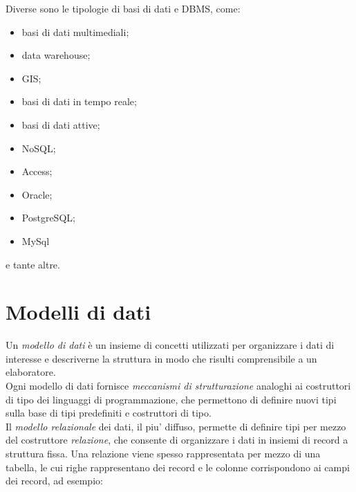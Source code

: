 \documentclass[12pt]{report}
\begin{document}
			Diverse sono le tipologie di basi di dati e DBMS, come:
			\begin{itemize}
				\item basi di dati multimediali;
				\item data warehouse;
				\item GIS;
				\item basi di dati in tempo reale;
				\item basi di dati attive;
				\item NoSQL;
				\item Access;
				\item Oracle;
				\item PostgreSQL;
				\item MySql
			\end{itemize}
			e tante altre. \\
			\section{Modelli di dati}
			Un \textit{modello di dati} è un insieme di concetti utilizzati per organizzare i dati di interesse e descriverne la struttura in modo che risulti comprensibile a un elaboratore. \\
			Ogni modello di dati fornisce \textit{meccanismi di strutturazione} analoghi ai costruttori di tipo dei linguaggi di programmazione, che permettono di definire nuovi tipi sulla base di tipi predefiniti e costruttori di tipo. \\
			Il \textit{modello relazionale} dei dati, il piu' diffuso, permette di definire tipi per mezzo del costruttore \textit{relazione}, che consente di organizzare i dati in insiemi di record a struttura fissa. Una relazione viene spesso rappresentata per mezzo di una tabella, le cui righe rappresentano dei record e le colonne corrispondono ai campi dei record, ad esempio: \\
\end{document}
